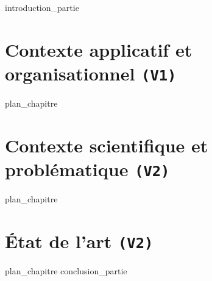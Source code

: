 \label{part:01_int}
{introduction_partie}
%
\chapter{Contexte applicatif et organisationnel \texttt{(V1)}}
\label{chap:1}
{plan_chapitre}
%
\chapter{Contexte scientifique et problématique \texttt{(V2)}}
\label{chap:2}
{plan_chapitre}
%
\chapter{État de l'art \texttt{(V2)}}
\label{chap:3}
{plan_chapitre}
%
\label{part:01_cnc}
{conclusion_partie}
